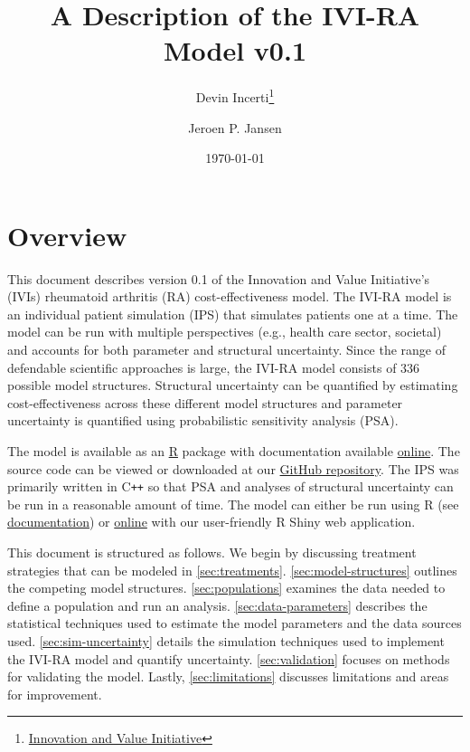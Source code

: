 \documentclass[11pt,final,fleqn]{article}\usepackage[]{graphicx}\usepackage[]{color}
\title{A Description of the IVI-RA Model v0.1}
\author{Devin Incerti\footnote{\href{http://www.thevalueinitiative.org/}{Innovation and Value Initiative}} \and Jeroen P. Jansen\sameaff}
\date{\today}
\theoremstyle{plain}
\newcommand\CPP{{C\texttt{++}}}
\newcommand\R{{\textsf{R}}}
\begin{document}
\maketitle

\begingroup
 \hypersetup{linkcolor=black} \tableofcontents
 \listoffigures
 \listoftables
\endgroup



\section{Overview}\label{overview}

This document describes version 0.1 of the Innovation and Value Initiative's (IVIs) rheumatoid arthritis (RA) cost-effectiveness model. The IVI-RA model is an individual patient simulation (IPS) that simulates patients one at a time. The model can be run with multiple perspectives (e.g., health care sector, societal) and accounts for both parameter and structural uncertainty. Since the range of defendable scientific approaches is large, the IVI-RA model consists of 336 possible model structures. Structural uncertainty can be quantified by estimating cost-effectiveness across these different model structures and parameter uncertainty is quantified using probabilistic sensitivity analysis (PSA). 

The model is available as an \href{https://cran.r-project.org/}{\R{}} package with documentation available \href{https://innovationvalueinitiative.github.io/IVI-RA/index.html}{online}. The source code can be viewed or downloaded at our \href{https://github.com/InnovationValueInitiative/IVI-RA}{GitHub repository}. The IPS was primarily written in \CPP{} so that PSA and analyses of structural uncertainty can be run in a reasonable amount of time. The model can either be run using \R{} (see \href{https://innovationvalueinitiative.github.io/IVI-RA/index.html}{documentation}) or \href{http://www.shinyapps.io/}{online} with our user-friendly R Shiny web application. 

This document is structured as follows. We begin by discussing treatment strategies that can be modeled in \autoref{sec:treatments}. \autoref{sec:model-structures} outlines the competing model structures. \autoref{sec:populations} examines the data needed to define a population and run an analysis. \autoref{sec:data-parameters} describes the statistical techniques used to estimate the model parameters and the data sources used. \autoref{sec:sim-uncertainty} details the simulation techniques used to implement the IVI-RA model and quantify uncertainty. \autoref{sec:validation} focuses on methods for validating the model. Lastly, \autoref{sec:limitations} discusses limitations and areas for improvement. 
\end{document}
